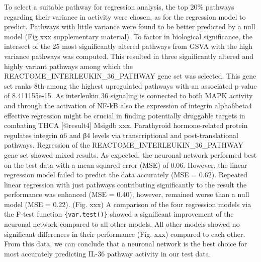 \documentclass[
]{article}
\begin{document}
To select a suitable pathway for regression analysis, the top 20\%
pathways regarding their variance in activity were chosen, as for the
regression model to predict. Pathways with little variance were found to
be better predicted by a null model (Fig xxx supplementary material). To
factor in biological significance, the intersect of the 25 most
significantly altered pathways from GSVA with the high variance pathways
was computed. This resulted in three significantly altered and highly
variant pathways among which the REACTOME\_INTERLEUKIN\_36\_PATHWAY gene
set was selected. This gene set ranks 8th among the highest upregulated
pathways with an associated p-value of 8.411155e-15. As interleukin 36
signaling is connected to both MAPK activity and through the activation
of NF-kB also the expression of integrin alpha6beta4 effective
regression might be crucial in finding potentially druggable targets in
combating THCA {[}@result4{]} Msigdb xxx. Parathyroid hormone-related
protein regulates integrin α6 and β4 levels via transcriptional and
post-translational pathways. Regression of the
REACTOME\_INTERLEUKIN\_36\_PATHWAY gene set showed mixed results. As
expected, the neuronal network performed best on the test data with a
mean squared error (MSE) of 0.06. However, the linear regression model
failed to predict the data accurately (MSE = 0.62). Repeated linear
regression with just pathways contributing significantly to the result
the performance was enhanced (MSE = 0.40), however, remained worse than
a null model (MSE = 0.22). (Fig. xxx) A comparison of the four
regression models via the F-test function \texttt{\{var.test()\}} showed
a significant improvement of the neuronal network compared to all other
models. All other models showed no significant differences in their
performance (Fig. xxx) compared to each other. From this data, we can
conclude that a neuronal network is the best choice for most accurately
predicting IL-36 pathway activity in our test data.
\end{document}
